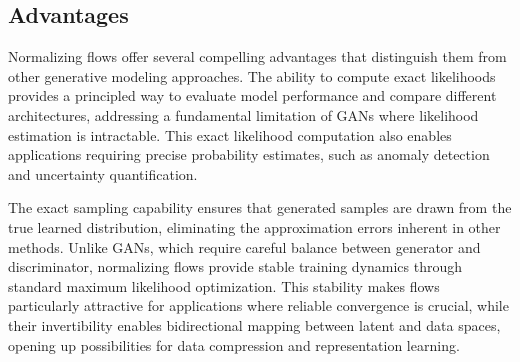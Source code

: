 \subsection{Advantages}

Normalizing flows offer several compelling advantages that distinguish them from other generative modeling approaches. The ability to compute exact likelihoods provides a principled way to evaluate model performance and compare different architectures, addressing a fundamental limitation of GANs where likelihood estimation is intractable. This exact likelihood computation also enables applications requiring precise probability estimates, such as anomaly detection and uncertainty quantification.

The exact sampling capability ensures that generated samples are drawn from the true learned distribution, eliminating the approximation errors inherent in other methods. Unlike GANs, which require careful balance between generator and discriminator, normalizing flows provide stable training dynamics through standard maximum likelihood optimization. This stability makes flows particularly attractive for applications where reliable convergence is crucial, while their invertibility enables bidirectional mapping between latent and data spaces, opening up possibilities for data compression and representation learning.





